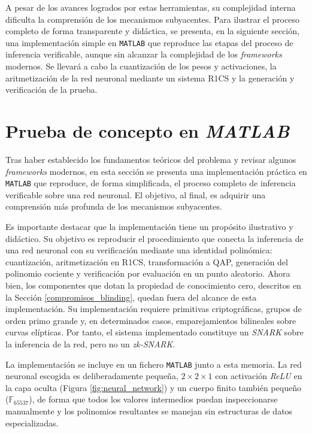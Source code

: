 \documentclass[a4paper, 11pt]{article}
\begin{document}
A pesar de los avances logrados por estas herramientas, su complejidad interna dificulta la comprensión
de los mecanismos subyacentes. Para ilustrar el proceso completo de forma transparente y didáctica, se
presenta, en la siguiente sección, una implementación simple en \texttt{MATLAB} que reproduce las etapas
del proceso de inferencia verificable, aunque sin alcanzar la complejidad de los \textit{frameworks}
modernos. Se llevará a cabo la cuantización de los pesos y activaciones, la aritmetización de la red
neuronal mediante un sistema R1CS y la generación y verificación de la prueba.

\pagebreak

\section{Prueba de concepto en \textit{MATLAB}} \label{zkml_matlab}

Tras haber establecido los fundamentos teóricos del problema y revisar algunos \textit{frameworks}
modernos, en esta sección se presenta una implementación práctica en \texttt{MATLAB} que reproduce,
de forma simplificada, el proceso completo de inferencia verificable sobre una red neuronal. El
objetivo, al final, es adquirir una comprensión más profunda de los mecanismos subyacentes.

Es importante destacar que la implementación tiene un propósito ilustrativo y didáctico. Su objetivo
es reproducir el procedimiento que conecta la inferencia de una red neuronal con su verificación
mediante una identidad polinómica: cuantización, aritmetización en R1CS, transformación a QAP,
generación del polinomio cociente y verificación por evaluación en un punto aleatorio. Ahora bien,
los componentes que dotan la propiedad de conocimiento cero, descritos en la Sección \ref{compromisos_blinding},
quedan fuera del alcance de esta implementación. Su implementación requiere primitivas criptográficas,
grupos de orden primo grande y, en determinados casos, emparejamientos bilineales sobre curvas
elípticas. Por tanto, el sistema implementado constituye un \textit{SNARK} sobre la inferencia de la
red, pero no un \textit{zk-SNARK}.

La implementación se incluye en un fichero \texttt{MATLAB} junto a esta memoria. La red neuronal
escogida es deliberadamente pequeña, $2 \times 2 \times 1$ con activación \textit{ReLU} en la capa
oculta (Figura \ref{fig:neural_network}) y un cuerpo finito también pequeño ($\mathbb{F}_{65537}$),
de forma que todos los valores intermedios puedan inspeccionarse manualmente y los polinomios
resultantes se manejan sin estructuras de datos especializadas.
\end{document}
